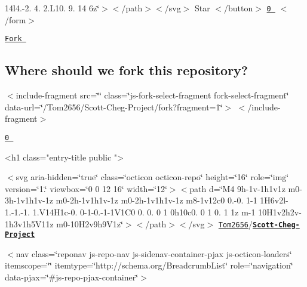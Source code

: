 \begin{DoxyItemize}
14l4.-\/2. 4. 2.\+L10. 9. 14 6z\char`\"{}$>$$<$/path$>$$<$/svg$>$ Star $<$/button$>$ \href{/Tom2656/Scott-Cheg-Project/stargazers}{\tt 0 } $<$/form$>$ 




\item \href{#fork-destination-box}{\tt Fork }

 \subsection*{Where should we fork this repository?}

 $<$include-\/fragment src=\char`\"{}\char`\"{} class=\char`\"{}js-\/fork-\/select-\/fragment fork-\/select-\/fragment\char`\"{} data-\/url=\char`\"{}/\+Tom2656/\+Scott-\/\+Cheg-\/\+Project/fork?fragment=1\char`\"{}$>$  $<$/include-\/fragment$>$ 

\href{/Tom2656/Scott-Cheg-Project/network}{\tt 0 }  
\end{DoxyItemize}\begin{DoxyVerb}<h1 class="entry-title public ">
\end{DoxyVerb}
 $<$svg aria-\/hidden=\char`\"{}true\char`\"{} class=\char`\"{}octicon octicon-\/repo\char`\"{} height=\char`\"{}16\char`\"{} role=\char`\"{}img\char`\"{} version=\char`\"{}1.\char`\"{} viewbox=\char`\"{}0 0 12 16\char`\"{} width=\char`\"{}12\char`\"{}$>$$<$path d=\char`\"{}\+M4 9h-\/1v-\/1h1v1z m0-\/3h-\/1v1h1v-\/1z m0-\/2h-\/1v1h1v-\/1z m0-\/2h-\/1v1h1v-\/1z m8-\/1v12c0 0.-\/0. 1-\/1 1\+H6v2l-\/1.-\/1.-\/1. 1.\+V14\+H1c-\/0. 0-\/1-\/0.-\/1-\/1\+V1\+C0 0. 0. 0 1 0h10c0. 0 1 0. 1 1z m-\/1 10\+H1v2h2v-\/1h3v1h5\+V11z m0-\/10\+H2v9h9\+V1z\char`\"{}$>$$<$/path$>$$<$/svg$>$ \href{/Tom2656}{\tt Tom2656}/{\bfseries \href{/Tom2656/Scott-Cheg-Project}{\tt Scott-\/\+Cheg-\/\+Project}}

   



  

$<$nav class=\char`\"{}reponav js-\/repo-\/nav js-\/sidenav-\/container-\/pjax js-\/octicon-\/loaders\char`\"{} itemscope=\char`\"{}\char`\"{} itemtype=\char`\"{}http\+://schema.\+org/\+Breadcrumb\+List\char`\"{} role=\char`\"{}navigation\char`\"{} data-\/pjax=\char`\"{}\#js-\/repo-\/pjax-\/container\char`\"{}$>$

